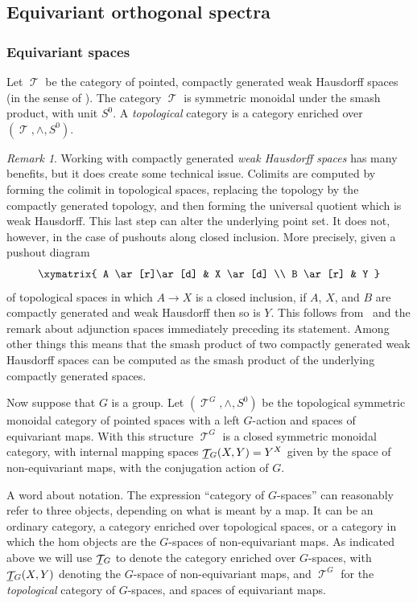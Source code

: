 \documentclass{amsart}
\newtheorem{rem}[equation]{Remark}
\theoremstyle{definition}
\theoremstyle{remark}
\newtheorem{rem}[equation]{Remark}
\DeclareMathOperator{\spaces}{\mathcal T}
\newcommand{\gspaces}[1]{\underline{\spaces\mkern-4mu}\mkern4mu_{\!#1}}
\newcommand{\ugspaces}[1]{\spaces^{#1}}
\begin{document}
\subsection{Equivariant orthogonal spectra}


\subsubsection{Equivariant spaces}\label{sec:equivariant-spaces}

Let $\spaces$ be the category of pointed, compactly generated weak
Hausdorff spaces (in the sense of \cite{MR0251719}).  The category
$\spaces$ is symmetric monoidal under the smash product, with unit
$S^{0}$.  A {\em topological} category is a category enriched over
$(\spaces, \wedge, S^{0})$.

\begin{rem}
\label{rem:66} 
Working with compactly generated {\em weak Hausdorff
spaces} has many benefits, but it does create some technical issue.
Colimits are computed by forming the colimit in topological spaces,
replacing the topology by the compactly generated topology, and then
forming the universal quotient which is weak Hausdorff.  This last
step can alter the underlying point set.  It does not, however,  in
the case of pushouts along closed inclusion.   More precisely, given a
pushout diagram
\[
\xymatrix{
A  \ar[r]\ar[d]  & X
\ar[d] \\
B  \ar[r]        & Y
}
\]
of topological spaces in which $A\to X$ is a closed inclusion, if $A$,
$X$, and $B$ are compactly generated and weak Hausdorff then so is
$Y$.  This follows from~\cite[Proposition~2.5]{MR0251719} and the
remark about adjunction spaces immediately preceding its statement.
Among other things this means that the smash product of two compactly
generated weak Hausdorff spaces can be computed as the smash product
of the underlying compactly generated spaces.
\end{rem}

Now suppose that $G$ is a group.  Let $(\ugspaces G,
\wedge, S^{0})$ be the topological symmetric monoidal category of
pointed spaces with a left $G$-action and spaces of equivariant maps.
With this structure $\ugspaces{G}$ is a closed symmetric monoidal
category, with internal mapping spaces $\gspaces G(X,Y)=Y^{X}$ given
by the space of non-equivariant maps, with the conjugation action of
$G$.  

A word about notation.  The expression ``category of $G$-spaces'' can
reasonably refer to three objects, depending on what is meant by a
map.  It can be an ordinary category, a category enriched over
topological spaces, or a category in which the hom objects are the
$G$-spaces of non-equivariant maps.  As indicated above we will use
$\gspaces{G}$ to denote the category enriched over $G$-spaces, with
$\gspaces G(X,Y)$ denoting the $G$-space of non-equivariant maps, and
$\ugspaces{G}$ for the {\em topological} category of $G$-spaces, and
spaces of equivariant maps.
\end{document}
